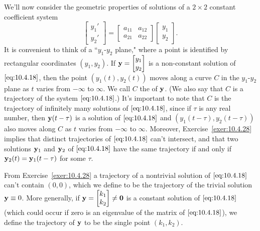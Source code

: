 \documentclass{ximera}
\begin{document}
We'll now  consider the geometric properties of solutions of a
$2\times2$ constant coefficient system
\begin{equation} \label{eq:10.4.18}
\begin{bmatrix}y_1'\\y_2'\end{bmatrix}=\begin{bmatrix}a_{11}&a_{12}\\a_{21}&a_{22}
\end{bmatrix}\begin{bmatrix}y_1\\y_2\end{bmatrix}.
\end{equation}
It is convenient to think of a ``$y_1$-$y_2$ plane," where a point
is identified by rectangular coordinates $(y_1,y_2)$. If ${\bf
y}=\begin{bmatrix}y_1\\y_2\end{bmatrix}$ is a non-constant solution of $\eqref{eq:10.4.18}$,
then the point $(y_1(t),y_2(t))$ moves along a curve $C$ in the
$y_1$-$y_2$ plane as $t$ varies from $-\infty$ to $\infty$. We call
$C$ the  of ${\bf y}$. (We also say that $C$ is a
trajectory of the system $\eqref{eq:10.4.18}$.) It's important to note that
$C$ is the trajectory of infinitely many solutions of $\eqref{eq:10.4.18}$,
since if $\tau$ is any real number, then ${\bf y}(t-\tau)$ is a
solution of $\eqref{eq:10.4.18}$ %
and
$(y_1(t-\tau),y_2(t-\tau))$ also moves along $C$ as $t$ varies from
$-\infty$ to $\infty$. Moreover, Exercise~\ref{exer:10.4.28}%
implies
that distinct trajectories of $\eqref{eq:10.4.18}$ can't intersect, and that
two solutions ${\bf y}_1$ and ${\bf y}_2$ of $\eqref{eq:10.4.18}$ have the
same trajectory if and only if ${\bf y}_2(t)={\bf y}_1(t-\tau)$ for
some $\tau$.

From Exercise~\ref{exer:10.4.28}%
a trajectory of a nontrivial
solution
of $\eqref{eq:10.4.18}$ can't contain $(0,0)$, which we define to be the
trajectory of the trivial solution ${\bf y}\equiv0$. More generally,
if ${\bf y}=\begin{bmatrix}k_1\\k_2\end{bmatrix}\neq{\bf 0}$ is a constant solution
of $\eqref{eq:10.4.18}$ (which could occur if zero is an eigenvalue of the
matrix of $\eqref{eq:10.4.18}$), we define the trajectory of ${\bf y}$ to be
the single point $(k_1,k_2)$.
\end{document}
